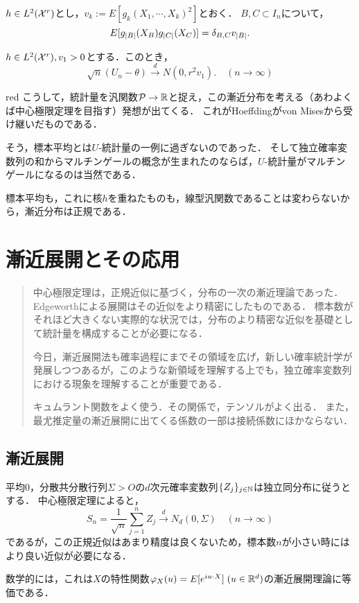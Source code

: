 \documentclass[uplatex,dvipdfmx]{jsreport}
\begin{document}
\begin{lemma}[漸近分布の分散]
    $h\in L^2(\mathcal{X}^r)$とし，$v_k:=E[g_k(X_1,\cdots,X_k)^2]$とおく．
    $B,C\subset I_n$について，
    \[E[g_{\lvert B\rvert}(X_B)g_{\lvert C\rvert}(X_C)]=\delta_{B,C}v_{\lvert B\rvert}.\]
\end{lemma}

\begin{theorem}[中心極限定理]
    $h\in L^2(\mathcal{X}^r),v_1>0$とする．このとき，
    \[\sqrt{n}(U_n-\theta)\xrightarrow{d}N(0,r^2v_1).\quad(n\to\infty)\]
\end{theorem}

\begin{tbox}{red}{}
    こうして，統計量を汎関数$\mathcal{P}\to\mathbb{R}$と捉え，この漸近分布を考える（あわよくば中心極限定理を目指す）発想が出てくる．
    これがHoeffdingがvon Misesから受け継いだものである．

    そう，標本平均とは$U$-統計量の一例に過ぎないのであった．
    そして独立確率変数列の和からマルチンゲールの概念が生まれたのならば，$U$-統計量がマルチンゲールになるのは当然である．

    標本平均も，これに核$h$を重ねたものも，線型汎関数であることは変わらないから，漸近分布は正規である．
\end{tbox}

\chapter{漸近展開とその応用}

\begin{quotation}
    中心極限定理は，正規近似に基づく，分布の一次の漸近理論であった．
    Edgeworthによる展開はその近似をより精密にしたものである．
    標本数がそれほど大きくない実際的な状況では，分布のより精密な近似を基礎として統計量を構成することが必要になる．

    今日，漸近展開法も確率過程にまでその領域を広げ，新しい確率統計学が発展しつつあるが，このような新領域を理解する上でも，独立確率変数列における現象を理解することが重要である．

    キュムラント関数をよく使う．その関係で，テンソルがよく出る．
    また，最尤推定量の漸近展開に出てくる係数の一部は接続係数にほかならない．
\end{quotation}

\section{漸近展開}

\begin{tcolorbox}[colframe=ForestGreen, colback=ForestGreen!10!white,breakable,colbacktitle=ForestGreen!40!white,coltitle=black,fonttitle=\bfseries\sffamily,
title=]
    平均$0$，分散共分散行列$\Sigma>O$の$d$次元確率変数列$\{Z_j\}_{j\in\mathbb{N}}$は独立同分布に従うとする．
    中心極限定理によると，
    \[S_n=\frac{1}{\sqrt{n}}\sum^n_{j=1}Z_j\xrightarrow{d}N_d(0,\Sigma)\quad(n\to\infty)\]
    であるが，この正規近似はあまり精度は良くないため，標本数$n$が小さい時にはより良い近似が必要になる．

    数学的には，これは$X$の特性関数$\varphi_X(u)=E[e^{iu\cdot X}]\;(u\in\mathbb{R}^d)$の漸近展開理論に等価である．
\end{tcolorbox}
\end{document}
